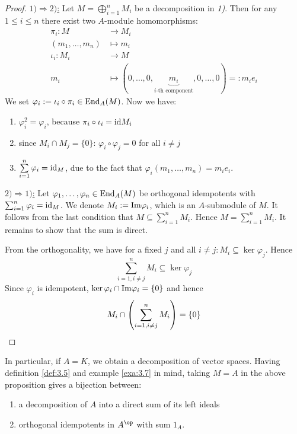 \documentclass[twoside = false,	%
		headsepline,		%
		parskip = true,
		]{scrbook}						%
\begin{document}
    \begin{proof}
        \underline{$1) \Rightarrow 2)$:}
        Let $M = \bigoplus_{i=1}^n M_i$ be a decomposition in \textit{1)}. Then for any $1 \leq i \leq n$ there exist two $A$-module homomorphisms:
        \begin{equation*}
        \begin{split}
            \pi_i: M &\to M_i \\
            (m_1,\dots,m_n) &\mapsto m_i \\
            \iota_i: M_i &\to M \\
            m_i &\mapsto (0,\dots,0,\underbrace{m_i}_{i\text{-th component}},0,\dots,0)=:m_i e_i
        \end{split}
        \end{equation*}
        We set $\varphi_i := \iota_i \circ \pi_i \in \mathrm{End}_A(M)$. Now we have:
        \begin{enumerate}
            \item $\varphi_i^2 = \varphi_i$, because $\pi_i \circ \iota_i = \mathrm{id} M_i$
            \item since $M_i \cap M_j = \{0\}$: $\varphi_i \circ \varphi_j = 0$ for all $i \neq j$ 
            \item $\sum\limits_{i=1}^n \varphi_i = \mathrm{id}_M$, due to the fact that $\varphi_i(m_1,\dots,m_n) = m_i e_i$.
        \end{enumerate}

        \underline{$2) \Rightarrow 1)$:} Let $\varphi_1,\dots,\varphi_n \in \mathrm{End}_A(M)$ be orthogonal idempotents with $\sum_{i=1}^n \varphi_i = \mathrm{id}_M$. We denote $M_i := \mathrm{Im} \varphi_i$, which is an $A$-submodule of $M$. It follows from the last condition that $M \subseteq \sum_{i=1}^n M_i$. Hence $M = \sum_{i=1}^n M_i$. It remains to show that the sum is direct.

        From the orthogonality, we have for a fixed $j$ and all $i \neq j: M_i \subseteq \ker \varphi_j$. Hence
        \begin{equation*}
            \sum_{i=1, i \neq j}^n M_i \subseteq \ker \varphi_j
        \end{equation*}
        Since $\varphi_i$ is idempotent, $\ker \varphi_i \cap \mathrm{Im} \varphi_i = \{0\}$ and hence
        \begin{equation*}
            M_i \cap \left( \sum_{i=1, i \neq j}^n M_i\right) = \{0\}
        \end{equation*}
    \end{proof}
    In particular, if $A = K$, we obtain a decomposition of vector spaces. Having definition \ref{def:3.5} and example \ref{exa:3.7} in mind, taking $M = A$ in the above proposition gives a bijection between:
    \begin{enumerate}
        \item a decomposition of $A$ into a direct sum of its left ideals
        \item orthogonal idempotents in $A^\op$ with sum $1_A$.
    \end{enumerate}
\end{document}
